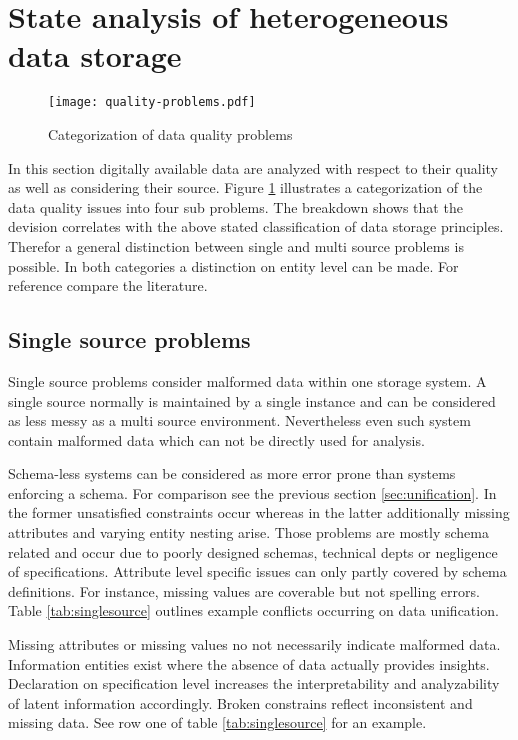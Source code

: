 \section{State analysis of heterogeneous data storage\label{sec:stateanalysis}}

\begin{figure}[htb]
  \centering
  \texttt{[image: quality-problems.pdf]}\\
  \caption{Categorization of data quality problems}\label{fig:qualityproblems}
\end{figure}

In this section digitally available data are analyzed with respect to their quality as well as considering their source. Figure \ref{fig:qualityproblems} illustrates a categorization of the data quality issues into four sub problems. The breakdown shows that the devision correlates with the above stated classification of data storage principles. Therefor a general distinction between single and multi source problems is possible. In both categories a distinction on entity level can be made. For reference compare the literature\cite{rahm_hai_do_2017}.

\subsection{Single source problems}

Single source problems consider malformed data within one storage system. A single source normally is maintained by a single instance and can be considered as less messy as a multi source environment. Nevertheless even such system contain malformed data which can not be directly used for analysis.

Schema-less systems can be considered as more error prone than systems enforcing a schema. For comparison see the previous section \ref{sec:unification}. In the former unsatisfied constraints occur whereas in the latter additionally missing attributes and varying entity nesting arise. Those problems are mostly schema related and occur due to poorly designed schemas, technical depts or negligence of specifications. Attribute level specific issues can only partly covered by schema definitions. For instance, missing values are coverable but not spelling errors. Table \ref{tab:singlesource} outlines example conflicts occurring on data unification. 

Missing attributes or missing values no not necessarily indicate malformed data. Information entities exist where the absence of data actually provides insights. Declaration on specification level increases the interpretability and analyzability of latent information accordingly. Broken constrains reflect inconsistent and missing data. See row one of table \ref{tab:singlesource} for an example.

